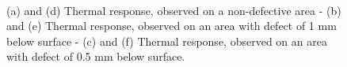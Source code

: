 
  \begin{figure}
  \centering
	

  \hspace*{\fill}
   \hfill
	\hspace*{\fill} \\ \hspace*{\fill}
   \hfill
  \hspace*{\fill}
	
	  \caption{(a) and (d) Thermal response, observed on a non-defective area - (b) and (e) 
	Thermal response, observed on an area with defect of 1 mm below surface - (c) and (f) 
	Thermal response, 
	observed on an area with defect of 0.5 mm below surface.}
	
  \label{fig:3}
\end{figure}

